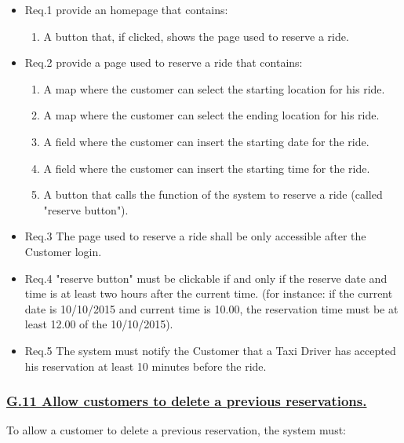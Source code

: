 				\begin{itemize}
					\item \lbrack Req.1\rbrack \label{sec:fr1_g10} provide an homepage that contains:
						\begin{enumerate}
							\item A button that, if clicked, shows the page used to reserve a ride.
						\end{enumerate}
					\item \lbrack Req.2\rbrack \label{sec:fr2_g10} provide a page used to reserve a ride that contains:
						\begin{enumerate}
							\item A map where the customer can select the starting location for his ride.
							\item A map where the customer can select the ending location for his ride.
							\item A field where the customer can insert the starting date for the ride.
							\item A field where the customer can insert the starting time for the ride.
							\item A button that calls the function of the system to reserve a ride (called "reserve button").
						\end{enumerate}
					\item \lbrack Req.3\rbrack \label{sec:fr3_g10} The page used to reserve a ride shall be only accessible after the Customer login.
					\item \lbrack Req.4\rbrack \label{sec:fr4_g10} "reserve button" must be clickable if and only if the reserve date and time is at least two hours after the current time. (for instance: if the current date is 10/10/2015 and current time is 10.00, the reservation time must be at least 12.00 of the 10/10/2015).
					\item \lbrack Req.5\rbrack \label{sec:fr5_g10} The system must notify the Customer that a Taxi Driver has accepted his reservation at least 10 minutes before the ride.
				\end{itemize}

			\subsubsection{\lbrack \hyperref[sec:g11]{G.11 Allow customers to delete a previous reservations.}\rbrack}\label{sec:frs11}
			To allow a customer to delete a previous reservation, the system must:

